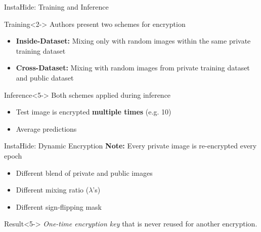 \documentclass[xcolor=table]{beamer} %
\begin{document}
\begin{frame}{InstaHide: Training and Inference}
    \begin{block}{Training}<2->
        Authors present two schemes for encryption
        \begin{itemize}[<+(2)- | handout:0>]
            \item \textbf{Inside-Dataset:} Mixing only with random images within the same private training dataset
            \item \textbf{Cross-Dataset:} Mixing with random images from private training dataset and public dataset
        \end{itemize}
    \end{block}

    \vspace{1em}

    \begin{block}{Inference}<5->
        Both schemes applied during inference
        \begin{itemize}[<+(4)- | handout:0>]
            \item Test image is encrypted \textbf{multiple times} (e.g. 10)
            \item Average predictions
        \end{itemize}
    \end{block}
\end{frame}

\begin{frame}{InstaHide: Dynamic Encryption}
    \textbf{Note:} Every private image is re-encrypted every epoch
    
    \begin{itemize}[<+(1)- | handout:0>]
        \item Different blend of private and public images 
        \item Different mixing ratio ($\lambda$'s)
        \item Different sign-flipping mask
    \end{itemize}
    
    \vspace{0.75em}

    \begin{block}{Result}<5->
        \textit{One-time encryption key} that is never reused for another encryption.
    \end{block}
\end{frame}
\end{document}
